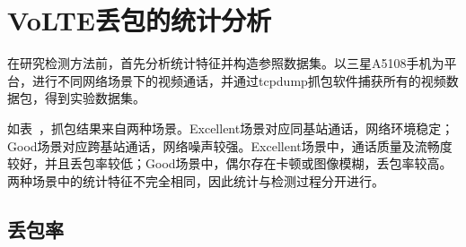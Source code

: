 \section{VoLTE丢包的统计分析}
\label{chap:analyze:results}

在研究检测方法前，首先分析统计特征并构造参照数据集。以三星A5108手机为平台，进行不同网络场景下的视频通话，并通过tcpdump抓包软件捕获所有的视频数据包，得到实验数据集。

如表\ ，抓包结果来自两种场景。Excellent场景对应同基站通话，网络环境稳定；Good场景对应跨基站通话，网络噪声较强。Excellent场景中，通话质量及流畅度较好，并且丢包率较低；Good场景中，偶尔存在卡顿或图像模糊，丢包率较高。两种场景中的统计特征不完全相同，因此统计与检测过程分开进行。

\subsection{丢包率}
\label{chap:analyze:results:plr}


